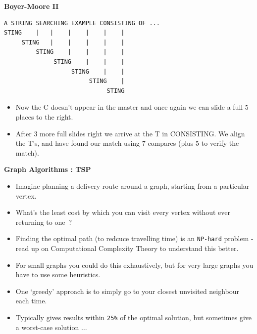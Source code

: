 \newpage
{\samepage
\begin{center}
{\Large{\bf Boyer-Moore II}}
\end{center}
{\small
\begin{verbatim}
A STRING SEARCHING EXAMPLE CONSISTING OF ...
STING    |   |    |    |    |    |
     STING   |    |    |    |    |
         STING    |    |    |    |
              STING    |    |    |
                   STING    |    |
                        STING    |
                             STING
\end{verbatim}
}
\begin{itemize}
\item Now the C doesn't appear in the master and once again we can slide a
full $5$ places to the right.
\item After $3$ more full slides right we arrive at the T in CONSISTING.
We align the T's, and have found our match using $7$ compares (plus $5$
to verify the match).
\end{itemize}
}

\newpage
{\samepage
\begin{center}
{\Large{\bf Graph Algorithms : TSP}}
\end{center}
{\small
\begin{itemize}
\item Imagine planning a delivery route around a graph, starting from a particular vertex.
\item What's the least cost by which you can visit every vertex without ever returning to one~?
\item Finding the optimal path (to redcuce travelling time) is an \verb^NP-hard^ problem - 
read up on Computational Complexity Theory to understand this better.
\item For small graphs you could do this exhaustively, but for very large graphs you have
to use some heuristics.
\item One `greedy' approach is to simply go to your closest unvisited neighbour each time.
\item Typically gives results within \verb^25%^
of the optimal solution, but sometimes give a worst-case solution $\ldots$
\end{itemize}
}}

